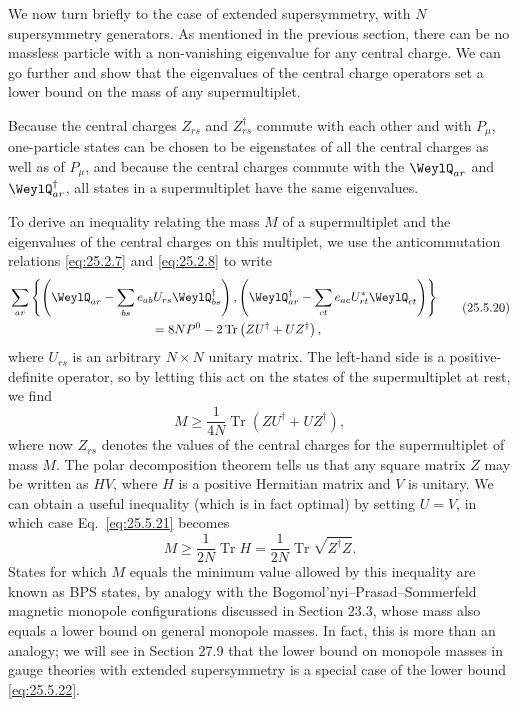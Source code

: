 We now turn briefly to the case of extended supersymmetry, with $N$
supersymmetry generators. As mentioned in the previous section, there can be
no massless particle with a non-vanishing eigenvalue for any central charge.
We can go further and show that the eigenvalues of the central charge
operators set a lower bound on the mass of any supermultiplet.

Because the central charges $Z_{rs}$ and $Z_{rs}^\dagger$ commute with each
other and with $P_\mu$, one-particle states can be chosen to be eigenstates of
all the central charges as well as of $P_\mu$, and because the central charges
commute with the $\WeylQ_{ar}$ and $\WeylQ_{ar}^\dagger$, all states in a
supermultiplet have the same eigenvalues.

To derive an inequality relating the mass $M$ of a supermultiplet and the
eigenvalues of the central charges on this multiplet, we use the
anticommutation relations \eqref{eq:25.2.7} and \eqref{eq:25.2.8} to write
\begin{equation}
\begin{aligned}
 &\sum_{ar}\left\{
 \left(\WeylQ_{ar}-\sum_{bs}e_{ab}U_{rs}\WeylQ_{bs}^\dagger\right),
 \left(\WeylQ_{ar}^\dagger
       -\sum_{ct}e_{ac}U_{rt}^*\WeylQ_{ct}\right)
 \right\}
 \\
 &\hspace{4cm}
 =8NP^0-2\operatorname{Tr}\left(ZU^\dagger+UZ^\dagger\right),
\end{aligned}
\tag{25.5.20}\label{eq:25.5.20}
\end{equation}
where $U_{rs}$ is an arbitrary $N\times N$ unitary matrix. The left-hand side
is a positive-definite operator, so by letting this act on the states of the
supermultiplet at rest, we find
\begin{equation}
 M\geq\frac{1}{4N}\operatorname{Tr}
 \left(ZU^\dagger+UZ^\dagger\right),
\tag{25.5.21}\label{eq:25.5.21}
\end{equation}
where now $Z_{rs}$ denotes the values of the central charges for the
supermultiplet of mass $M$. The polar decomposition theorem tells us that any
square matrix $Z$ may be written as $HV$, where $H$ is a positive Hermitian
matrix and $V$ is unitary. We can obtain a useful inequality (which is in fact
optimal) by setting $U=V$, in which case Eq.~\eqref{eq:25.5.21} becomes
\begin{equation}
 M\geq\frac{1}{2N}\operatorname{Tr}H
 =\frac{1}{2N}\operatorname{Tr}\sqrt{Z^\dagger Z}.
\tag{25.5.22}\label{eq:25.5.22}
\end{equation}
States for which $M$ equals the minimum value allowed by this inequality are
known as BPS states, by analogy with the
Bogomol'nyi--Prasad--Sommerfeld magnetic monopole configurations discussed in
Section 23.3, whose mass also equals a lower bound on general monopole masses.
In fact, this is more than an analogy; we will see in Section 27.9 that the
lower bound on monopole masses in gauge theories with extended supersymmetry
is a special case of the lower bound \eqref{eq:25.5.22}.

